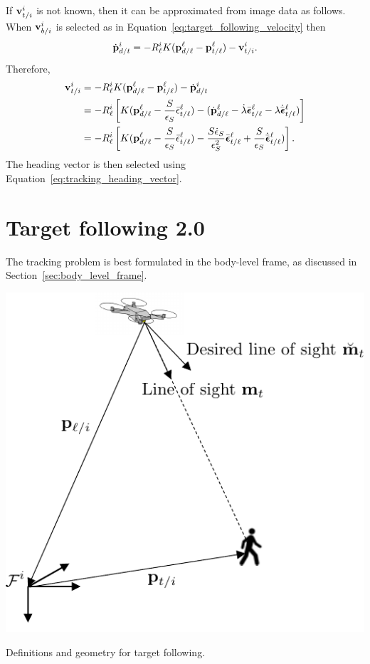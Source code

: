 If $\mathbf{v}_{t/i}^i$ is not known, then it can be approximated from image data as follows.  When $\mathbf{v}_{b/i}^i$ is selected as in Equation~\eqref{eq:target_following_velocity} then
\[
\dot{\mathbf{p}}_{d/t}^i = -R_\ell^i K (\mathbf{p}_{d/\ell}^\ell - \mathbf{p}_{t/\ell}^\ell) - \mathbf{v}_{t/i}^i.
\]
Therefore,
\begin{align*}
\mathbf{v}_{t/i}^i &= -R_\ell^i K (\mathbf{p}_{d/\ell}^\ell - \mathbf{p}_{t/\ell}^\ell) - \dot{\mathbf{p}}_{d/t}^i \\
	&= -R_\ell^i \left[ K (\mathbf{p}_{d/\ell}^\ell - \frac{S}{\epsilon_S}\bar{\epsilon}_{t/\ell}^\ell) - (\dot{\mathbf{p}}_{d/\ell}^\ell - \dot{\lambda}\bar{\boldsymbol{\epsilon}}_{t/\ell}^\ell - \lambda\dot{\bar{\boldsymbol{\epsilon}}}_{t/\ell}^\ell) \right] \\
	&= -R_\ell^i \left[ K (\mathbf{p}_{d/\ell}^\ell - \frac{S}{\epsilon_S}\bar{\epsilon}_{t/\ell}^\ell)  - \frac{S\dot{\epsilon}_S}{\epsilon_S^2}\bar{\boldsymbol{\epsilon}}_{t/\ell}^\ell + \frac{S}{\epsilon_S}\dot{\bar{\boldsymbol{\epsilon}}}_{t/\ell}^\ell) \right].
\end{align*}
The heading vector is then selected using Equation~\eqref{eq:tracking_heading_vector}.


\section{Target following 2.0}
\label{sec:target_following_2}

The tracking problem is best formulated in the body-level frame, as discussed in Section~\ref{sec:body_level_frame}.  

\begin{marginfigure}
	\includegraphics[width=\linewidth]{chap10_tracking/figures/target_following}
	\caption{Definitions and geometry for target following.}
	\label{fig:following}
\end{marginfigure}

